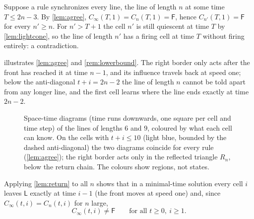 \begin{remark}\label{rem:lowerbound}
Suppose a rule synchronizes every line, the line of length $n$ at some time
$T\le 2n-3$. By \cref{lem:agree}, $C_\infty(T,1)=C_n(T,1)=\mathsf F$, hence
$C_{n'}(T,1)=\mathsf F$ for every $n'\ge n$. For $n'>T+1$ the cell $n'$ is still
quiescent at time $T$ by \cref{lem:lightcone}, so the line of length $n'$
has a firing cell at time $T$ without firing entirely: a contradiction.
\end{remark}

 illustrates \cref{lem:agree} and \cref{rem:lowerbound}.
The right border only acts after the front has reached it at time $n-1$,
and its influence travels back at speed one; below the anti-diagonal
$t+i=2n-2$ the line of length $n$ cannot be told apart from any longer
line, and the first cell learns where the line ends exactly at time
$2n-2$.

\begin{figure}[t]
\centering

\caption{Space-time diagrams (time runs downwards, one square per cell and
time step) of the lines of lengths $6$ and $9$, coloured by what each cell
can know. On the cells with $t+i\le10$ (light blue, bounded by the dashed
anti-diagonal) the two diagrams coincide for every rule (\cref{lem:agree});
the right border acts only in the reflected triangle $R_n$, below the
return chain. The colours show regions, not states.}
\label{fig:echo}
\end{figure}

Applying \cref{lem:return} to all $n$ shows that in a minimal-time
solution every cell $i$ leaves $\mathsf L$ exactly at time $i-1$ (the front
moves at speed one) and, since $C_\infty(t,i)=C_{n}(t,i)$ for $n$ large,
\begin{equation}\label{eq:neverfire}
C_\infty(t,i)\neq\mathsf F\qquad\text{for all }t\ge0,\ i\ge1 .
\end{equation}

